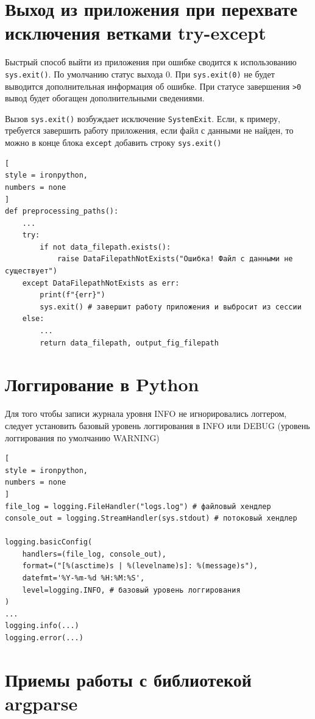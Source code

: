 \documentclass[%
	11pt,
	a4paper,
	utf8,
		]{article}
\begin{document}
\section{Выход из приложения при перехвате исключения ветками try-except}

Быстрый способ выйти из приложения при ошибке сводится к использованию \texttt{sys.exit()}. По умолчанию статус выхода 0. При \texttt{sys.exit(0)} не будет выводится дополнительная информация об ошибке. При статусе завершения \texttt{>0} вывод будет обогащен дополнительными сведениями.

Вызов \texttt{sys.exit()} возбуждает исключение \texttt{SystemExit}. Если, к примеру, требуется завершить работу приложения, если файл с данными не найден, то можно в конце блока \texttt{except} добавить строку \texttt{sys.exit()}
\begin{lstlisting}[
style = ironpython,
numbers = none	
]
def preprocessing_paths():
    ...
    try:
        if not data_filepath.exists():
            raise DataFilepathNotExists("Ошибка! Файл с данными не существует")
    except DataFilepathNotExists as err:
        print(f"{err}")
        sys.exit() # завершит работу приложения и выбросит из сессии
    else:
        ...
        return data_filepath, output_fig_filepath
\end{lstlisting}

\section{Логгирование в Python}

Для того чтобы записи журнала уровня INFO не игнорировались логгером, следует установить базовый уровень логгирования в INFO или DEBUG (уровень логгирования по умолчанию WARNING)
\begin{lstlisting}[
style = ironpython,
numbers = none	
]
file_log = logging.FileHandler("logs.log") # файловый хендлер
console_out = logging.StreamHandler(sys.stdout) # потоковый хендлер

logging.basicConfig(
    handlers=(file_log, console_out),
    format=("[%(asctime)s | %(levelname)s]: %(message)s"),
    datefmt='%Y-%m-%d %H:%M:%S',
    level=logging.INFO, # базовый уровень логгирования
)
...
logging.info(...)
logging.error(...)
\end{lstlisting}


\section{Приемы работы с библиотекой argparse}
\end{document}
